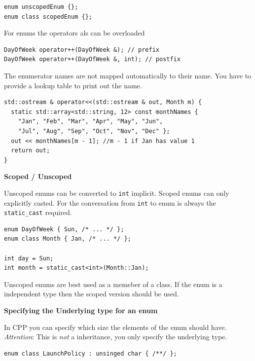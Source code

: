 \documentclass[11pt,twoside,landscape]{article}
\begin{document}
\begin{multicols}{3}
\lstset{language=c++,label= ,caption= ,captionpos=b,numbers=none}
\begin{lstlisting}
enum unscopedEnum {};
enum class scopedEnum {};
\end{lstlisting}

For enums the operators als can be overloaded
\lstset{language=c++,label= ,caption= ,captionpos=b,numbers=none}
\begin{lstlisting}
DayOfWeek operator++(DayOfWeek &); // prefix
DayOfWeek operator++(DayOfWeek &, int); // postfix
\end{lstlisting}

The enumerator names are not mapped automatically to their name.
You have to provide a lookup table to print out the name.

\lstset{language=c++,label= ,caption= ,captionpos=b,numbers=none}
\begin{lstlisting}
std::ostream & operator<<(std::ostream & out, Month m) {
  static std::array<std::string, 12> const monthNames {
    "Jan", "Feb", "Mar", "Apr", "May", "Jun",
    "Jul", "Aug", "Sep", "Oct", "Nov", "Dec" };
  out << monthNames[m - 1]; //m - 1 if Jan has value 1
  return out;
}
\end{lstlisting}

\textbf{Scoped / Unscoped}

Unscoped enums can be converted to \texttt{int} implicit.
Scoped enums can only explicitly casted.
For the conversation from \texttt{int} to enum is always the \texttt{static\_cast} required.

\lstset{language=c++,label= ,caption= ,captionpos=b,numbers=none}
\begin{lstlisting}
enum DayOfWeek { Sun, /* ... */ };
enum class Month { Jan, /* ... */ };

int day = Sun;
int month = static_cast<int>(Month::Jan);
\end{lstlisting}

Unscoped enums are best used as a memeber of a class.
If the enum is a independent type then the scoped version should be used.

\textbf{Specifying the Underlying type for an enum}

In CPP you can specify which size the elements of the enum should have.
\emph{Attention}: This is \emph{not} a inheritance, you only specify the underlying type.
\lstset{language=c++,label= ,caption= ,captionpos=b,numbers=none}
\begin{lstlisting}
enum class LaunchPolicy : unsinged char { /**/ };
\end{lstlisting}


\end{multicols}
\end{document}

